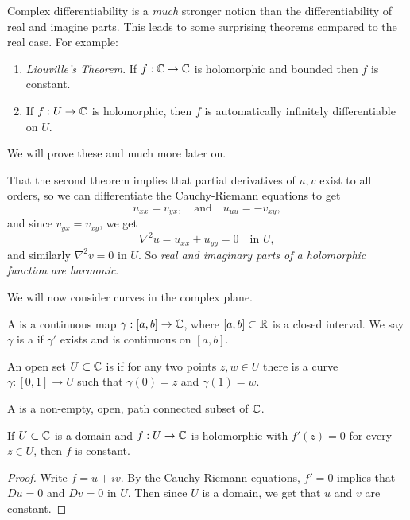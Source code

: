 \documentclass[a4paper]{scrartcl}
\begin{document}
Complex differentiability is a \emph{much} stronger notion than the differentiability of real and imagine parts. This leads to some surprising theorems compared to the real case. For example: 
\begin{enumerate}[label=(\alph*)]
    \item \emph{Liouville's Theorem}. If $f: \mathbb{C} \rightarrow \mathbb{C}$ is holomorphic and bounded then $f$ is constant.
    \item If $f: U \rightarrow \mathbb{C}$ is holomorphic, then $f$ is automatically infinitely differentiable on $U$.
\end{enumerate}
We will prove these and much more later on.

\begin{remark}
That the second theorem implies that partial derivatives of $u, v$ exist to all orders, so we can differentiate the Cauchy-Riemann equations to get
$$
u_{xx} = v_{yx}, \quad \text{and} \quad u_{uu} = -v_{xy},
$$
and since $v_{yx} = v_{xy}$, we get
$$
\nabla^2 u = u_{xx} + u_{yy} = 0 \quad \text{in }U, 
$$
and similarly $\nabla^2 v = 0$ in $U$. So \emph{real and imaginary parts of a holomorphic function are harmonic}.
\end{remark}

We will now consider curves in the complex plane.

\begin{definition}[Curve]
A  is a continuous map $\gamma: [a, b] \rightarrow \mathbb{C}$, where $[a, b] \subset \mathbb{R}$ is a closed interval. We say $\gamma$ is a  if $\gamma'$ exists and is continuous on $[a, b]$. 
\end{definition}

\begin{definition}
    An open set $U \subset \mathbb{C}$ is  if for any two points $z, w \in U$ there is a curve $\gamma : [0, 1] \rightarrow U$ such that $\gamma(0) = z$ and $\gamma(1) = w$.
\end{definition}

\begin{definition}[Domain]
    A  is a non-empty, open, path connected subset of $\mathbb{C}$.
\end{definition}

\begin{corollary}
    If $U \subset \mathbb{C}$ is a domain and $f: U \rightarrow \mathbb{C}$ is holomorphic with $f'(z) = 0$ for every $z \in U$, then $f$ is constant.
\end{corollary}
\begin{proof}
    Write $f = u + iv$. By the Cauchy-Riemann equations, $f' = 0$ implies that $Du = 0$ and $Dv = 0$ in $U$. Then since $U$ is a domain, we get that $u$ and $v$ are constant.
\end{proof}
\end{document}
